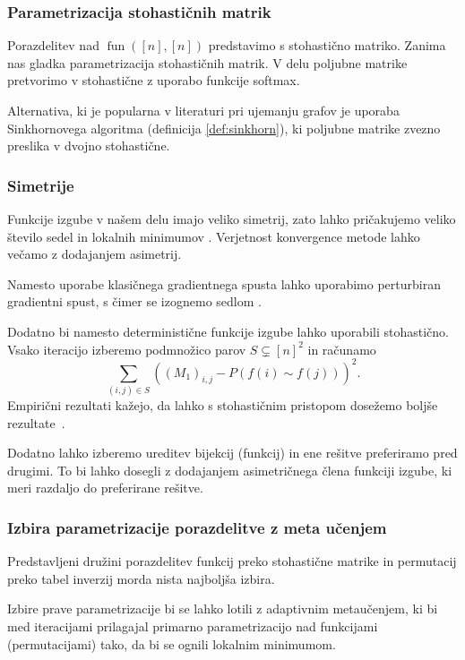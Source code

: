 \documentclass[mat2, tisk]{fmfdelo}
\newcommand{\fun}{\operatorname{fun}}
\newcommand{\funnn}[1]{\fun([#1], [#1])}
\begin{document}
\subsubsection{Parametrizacija stohastičnih matrik}
Porazdelitev nad $\funnn{n}$ predstavimo s stohastično matriko. Zanima nas
gladka parametrizacija stohastičnih matrik. V delu
poljubne matrike pretvorimo v stohastične z uporabo funkcije softmax.

Alternativa, ki je popularna v literaturi pri ujemanju grafov je
uporaba Sinkhornovega algoritma (definicija \ref{def:sinkhorn}), ki
poljubne matrike zvezno preslika
v dvojno stohastične.
%
\subsubsection{Simetrije}
Funkcije izgube v našem delu imajo veliko simetrij,
zato lahko pričakujemo veliko
število sedel in lokalnih minimumov
\cite{schneider2025ubiquitoussymmetrycriticalpoints}. Verjetnost
konvergence metode lahko večamo
z dodajanjem asimetrij.

Namesto uporabe klasičnega gradientnega spusta lahko uporabimo
perturbiran gradientni spust, s čimer se izognemo sedlom
\cite{schneider2025ubiquitoussymmetrycriticalpoints}.

Dodatno bi namesto deterministične funkcije izgube
lahko uporabili stohastično. Vsako iteracijo izberemo podmnožico
parov $S \subsetneq [n]^2$ in računamo
$$
\sum_{(i,j) \in S} \left ((M_1)_{i,j} - P(f(i) \sim f(j))\right )^2.
$$
Empirični rezultati kažejo, da lahko s stohastičnim pristopom
dosežemo boljše rezultate~\cite{Andersen_2016}.

Dodatno lahko izberemo ureditev bijekcij (funkcij) in ene rešitve
preferiramo pred
drugimi. To bi lahko dosegli z dodajanjem asimetričnega člena
funkciji izgube, ki meri razdaljo do preferirane rešitve.
\subsubsection{Izbira parametrizacije porazdelitve z meta učenjem}
Predstavljeni družini porazdelitev funkcij preko stohastične matrike in
permutacij preko tabel inverzij morda nista najboljša izbira.

Izbire prave parametrizacije bi se lahko lotili z adaptivnim metaučenjem,
ki bi med iteracijami prilagajal primarno parametrizacijo nad
funkcijami (permutacijami) tako, da bi se ognili lokalnim minimumom.
\end{document}
